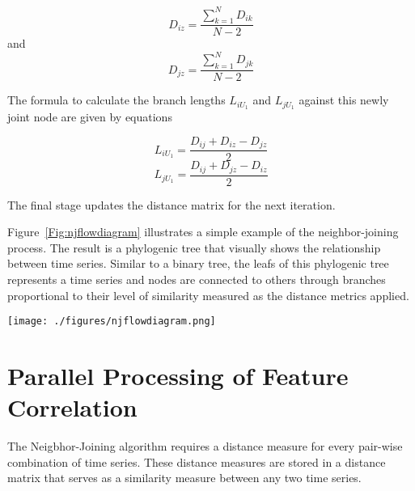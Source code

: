 $$D_{iz}=\frac{\sum\limits_{k=1}^{N} D_{ik}}{N-2}$$ and $$D_{jz}=\frac{\sum\limits_{k=1}^{N} D_{jk}}{N-2}$$


The formula to calculate the branch lengths $L_{iU_1}$ and $L_{jU_1}$ against this newly joint node are given by equations

\begin{equation}
L_{iU_1} = \frac{D_{ij}+D_{iz}-D_{jz}}{2}
\end{equation}
$$L_{jU_1} = \frac{D_{ij}+D_{jz}-D_{iz}}{2}$$

The final stage updates the distance matrix for the next iteration. 


Figure~\ref{Fig:njflowdiagram} illustrates a simple example of the neighbor-joining process. The result is a phylogenic tree that visually shows the relationship between time series. Similar to a binary tree, the leafs of this phylogenic tree represents a time series and nodes are connected to others through branches proportional to their level of similarity measured as the distance metrics applied.

\begin{figure*}
	\begin{center}
	\texttt{[image: ./figures/njflowdiagram.png]}
	\caption{Neighbor-Joining example on arbitrary distance matrix. In iteration 1, the phylogenic tree initializes all the nodes with equal distances. The Q matrix is computed from the inital distance matrix, where time series $a$ and $b$  are identified as the closest nodes. These nodes are joined as node $u$. Their branch length are calculated and the distance matrix is updated. In iteration 2, time series $c$  and $u$ are joined as node $v$. Their branch length are calculated and the distance matrix is updated. In iteration 3, branch node $v$ and timeseries $d$ are joined as node $w$ and their branch length are calculated. The distance between $w$ and $e$ is finalliy calculated.} \label{Fig:njflowdiagram}
	\end{center}
\end{figure*}


\section{Parallel Processing of Feature Correlation}\label{subsec:feature_correlation}
The Neigbhor-Joining algorithm requires a distance measure for
every pair-wise combination of time series. These distance measures are stored in a 
distance matrix that serves as a similarity measure between any two time series. 

